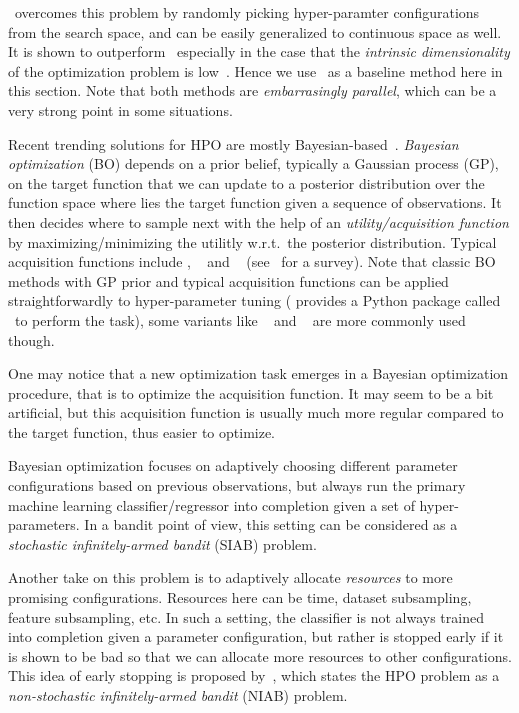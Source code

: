 \documentclass[twoside,11pt]{article}
\begin{document}
\Random\ overcomes this problem by randomly picking hyper-paramter configurations from the search space, and can be easily generalized to continuous space as well. It is shown to outperform \Grid\ especially in the case that the \emph{intrinsic dimensionality} of the optimization problem is low~\citep{bergstra2012random}. Hence we use \Random\ as a baseline method here in this section. Note that both methods are \emph{embarrasingly parallel}, which can be a very strong point in some situations.

Recent trending solutions for HPO are mostly Bayesian-based~\citep{bergstra2011tpe,hutter2011smac,snoek2012spearmint,snoek2015}. \emph{Bayesian optimization} (BO) depends on a prior belief, typically a Gaussian process (GP), on the target function that we can update to a posterior distribution over the function space where lies the target function given a sequence of observations. It then decides where to sample next with the help of an \emph{utility/acquisition function} by maximizing/minimizing the utilitly w.r.t.\ the posterior distribution. Typical acquisition functions include \EI, \PI~\citep{mockus1978} and \GPUCB~\citep{srinivas2010gpucb} (see~\citealt{brochu2010bayesian,shahriari2016loop} for a survey). Note that classic BO methods with GP prior and typical acquisition functions can be applied straightforwardly to hyper-parameter tuning (\citealt{snoek2012spearmint} provides a Python package called \Spearmint\ to perform the task), some variants like \TPE~\citep{bergstra2011tpe} and \SMAC~\citep{hutter2011smac} are more commonly used though.

\begin{remark}
	One may notice that a new optimization task emerges in a Bayesian optimization procedure, that is to optimize the acquisition function. It may seem to be a bit artificial, but this acquisition function is usually much more regular compared to the target function, thus easier to optimize.
\end{remark}

Bayesian optimization focuses on adaptively choosing different parameter configurations based on previous observations, but always run the primary machine learning classifier/regressor into completion given a set of hyper-parameters. In a bandit point of view, this setting can be considered as a \emph{stochastic infinitely-armed bandit} (SIAB) problem.

Another take on this problem is to adaptively allocate \emph{resources} to more promising configurations. Resources here can be time, dataset subsampling, feature subsampling, etc. In such a setting, the classifier is not always trained into completion given a parameter configuration, but rather is stopped early if it is shown to be bad so that we can allocate more resources to other configurations. This idea of early stopping is proposed by~\cite{li2016}, which states the HPO problem as a \emph{non-stochastic infinitely-armed bandit} (NIAB) problem.
\end{document}
